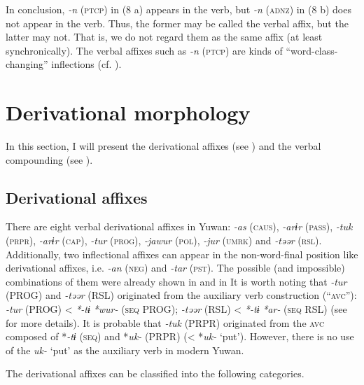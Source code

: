  In conclusion, \textit{-n} (\textsc{ptcp}) in (8 a) appears in the verb, but \textit{-n} (\textsc{adnz}) in (8 b) does not appear in the verb. Thus, the former may be called the verbal affix, but the latter may not. That is, we do not regard them as the same affix (at least synchronically). The verbal affixes such as \textit{-n} (\textsc{ptcp}) are kinds of “word-class-changing” inflections (cf. \citealt{Haspelmath1996}).

\section{Derivational morphology}

In this section, I will present the derivational affixes (see ) and the verbal compounding (see ).

\subsection{Derivational affixes}

There are eight verbal derivational affixes in Yuwan: \textit{-as} (\textsc{caus}), \textit{-arɨr} (\textsc{pass}), \textit{-tuk} (\textsc{prpr}), \textit{-arɨr} (\textsc{cap}), \textit{-tur} (\textsc{prog}), \textit{-jawur} (\textsc{pol}), \textit{-jur} (\textsc{umrk}) and \textit{-təər} (\textsc{rsl}). Additionally, two inflectional affixes can appear in the non-word-final position like derivational affixes, i.e. \textit{-an} (\textsc{neg}) and \textit{-tar} (\textsc{pst}). The possible (and impossible) combinations of them were already shown in  and  in  It is worth noting that \textit{-tur} (PROG) and \textit{-təər} (RSL) originated from the auxiliary verb construction (“\textsc{avc}”): \textit{-tur} (PROG) < \textit{*-tɨ} \textit{*wur-} (\textsc{seq} PROG); \textit{-təər} (RSL) < \textit{*-tɨ} \textit{*ar-} (\textsc{seq} RSL) (see  for more details). It is probable that \textit{-tuk} (PRPR) originated from the \textsc{avc} composed of *\textit{-tɨ} (\textsc{seq}) and *\textit{uk-} (PRPR) (< *\textit{uk-} ‘put’). However, there is no use of the \textit{uk-} ‘put’ as the auxiliary verb in modern Yuwan.

  The derivational affixes can be classified into the following categories.


